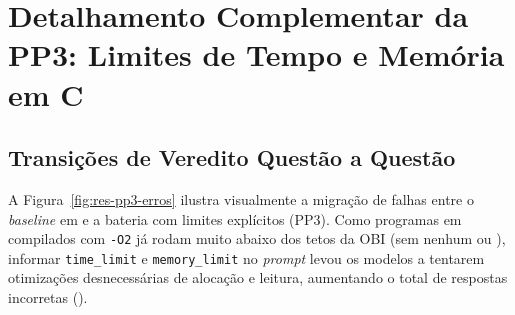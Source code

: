 \begin{table}[!htbp]
\centering
\caption{Consumo médio de \textit{tokens} por questão e custo total em dólares nas $46$ questões em  (PP2).}
\label{tab:res-pp2-custos}
\small
{}
\end{table}
\FloatBarrier

\section{Detalhamento Complementar da PP3: Limites de Tempo e Memória em C}\label{ap:pp3-detalhes}

\subsection{Transições de Veredito Questão a Questão}\label{sec:res-rq3-overeng}

A Figura~\ref{fig:res-pp3-erros} ilustra visualmente a migração de falhas entre o \textit{baseline} em  e a bateria com limites explícitos (PP3). Como programas em  compilados com \texttt{-O2} já rodam muito abaixo dos tetos da OBI (sem nenhum  ou ), informar \texttt{time\_limit} e \texttt{memory\_limit} no \textit{prompt} levou os modelos a tentarem otimizações desnecessárias de alocação e leitura, aumentando o total de respostas incorretas ().

